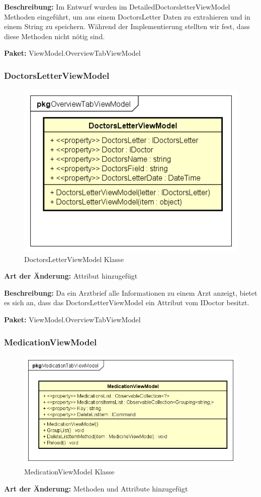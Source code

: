 \documentclass[a4paper]{scrreprt}
\begin{document}
\textbf{Beschreibung:} Im Entwurf wurden im DetailedDoctorsletterViewModel Methoden eingeführt, um aus einem DoctorsLetter Daten zu extrahieren und in einem String zu speichern. Während der Implementierung stellten wir fest, dass diese Methoden nicht nötig sind. 

\textbf{Paket:} ViewModel.OverviewTabViewModel

\subsubsection{DoctorsLetterViewModel}
\begin{figure}[H]
\centering
\includegraphics[width=0.45\textheight]{graphics/Klassendiagramme/ViewModel/DoctorsLetterViewModel}
\caption{DoctorsLetterViewModel Klasse}
\end{figure}
\textbf{Art der Änderung:} Attribut hinzugefügt

\textbf{Beschreibung:}  Da ein Arztbrief alle Informationen zu einem Arzt anzeigt, bietet es sich an, dass das DoctorsLetterViewModel ein Attribut vom IDoctor besitzt.

\textbf{Paket:} ViewModel.OverviewTabViewModel

\subsubsection{MedicationViewModel}
\begin{figure}[H]
\centering
\includegraphics[width=0.45\textheight]{graphics/Klassendiagramme/ViewModel/MedicationViewModel}
\caption{MedicationViewModel Klasse}
\end{figure}
\textbf{Art der Änderung:} Methoden und Attribute hinzugefügt
\end{document}
